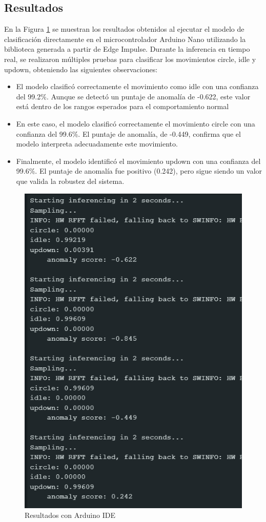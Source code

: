 \documentclass[12pt,a4paper]{article}
\begin{document}
\subsection{Resultados}

En la Figura \ref{fig:19} se muestran los resultados obtenidos al ejecutar el modelo de clasificación directamente en el microcontrolador Arduino Nano utilizando la biblioteca generada a partir de Edge Impulse. Durante la inferencia en tiempo real, se realizaron múltiples pruebas para clasificar los movimientos circle, idle y updown, obteniendo las siguientes observaciones:
\begin{itemize}
    \item El modelo clasificó correctamente el movimiento como idle con una confianza del 99.2\%. Aunque se detectó un puntaje de anomalía de -0.622, este valor está dentro de los rangos esperados para el comportamiento normal
    \item En este caso, el modelo clasificó correctamente el movimiento circle con una confianza del 99.6\%. El puntaje de anomalía, de -0.449, confirma que el modelo interpreta adecuadamente este movimiento.
    \item Finalmente, el modelo identificó el movimiento updown con una confianza del 99.6\%. El puntaje de anomalía fue positivo (0.242), pero sigue siendo un valor que valida la robustez del sistema.
\end{itemize}

\begin{figure}[H]
    \centering
    \includegraphics[width=0.45\linewidth]{Imagenes/results_2.png}
    \caption{Resultados con Arduino IDE}
    \label{fig:19}
\end{figure}
\end{document}
